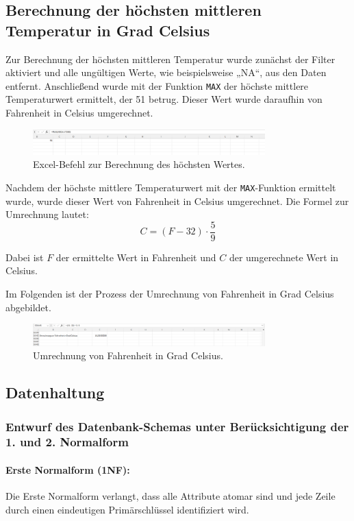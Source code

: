 \documentclass[a4paper,12pt]{article}
\begin{document}
\subsection{Berechnung der höchsten mittleren Temperatur in Grad Celsius}
Zur Berechnung der höchsten mittleren Temperatur wurde zunächst der Filter aktiviert und alle ungültigen Werte, wie beispielsweise „NA“, aus den Daten entfernt. Anschließend wurde mit der Funktion \texttt{MAX} der höchste mittlere Temperaturwert ermittelt, der 51 betrug. Dieser Wert wurde daraufhin von Fahrenheit in Celsius umgerechnet.


\begin{figure}[h!]
\centering
\includegraphics[width=0.8\textwidth]{20241201_18191811.png} %
\caption{Excel-Befehl zur Berechnung des höchsten Wertes.}
\label{fig:excel_command}
\end{figure}
Nachdem der höchste mittlere Temperaturwert mit der \texttt{MAX}-Funktion ermittelt wurde, wurde dieser Wert von Fahrenheit in Celsius umgerechnet. Die Formel zur Umrechnung lautet:
\[
C = (F - 32) \cdot \frac{5}{9}
\]

Dabei ist \(F\) der ermittelte Wert in Fahrenheit und \(C\) der umgerechnete Wert in Celsius.

Im Folgenden ist der Prozess der Umrechnung von Fahrenheit in Grad Celsius abgebildet.

\begin{figure}[h!]
\centering
\includegraphics[width=0.8\textwidth]{20241201_18485367.png} %
\caption{Umrechnung von Fahrenheit in Grad Celsius.}
\label{fig:fahrenheit_to_celsius}
\end{figure}


\subsection{Datenhaltung}
\subsubsection{Entwurf des Datenbank-Schemas unter Berücksichtigung der 1. und 2. Normalform}
\paragraph{Erste Normalform (1NF):}
Die Erste Normalform verlangt, dass alle Attribute atomar sind und jede Zeile durch einen eindeutigen Primärschlüssel identifiziert wird.
\end{document}
